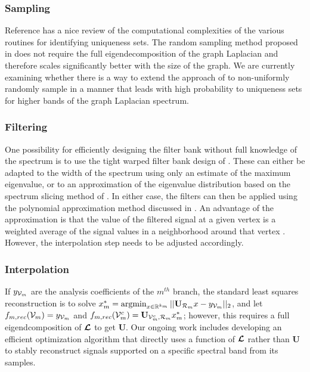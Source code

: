 \documentclass[journal, 10pt]{IEEEtran}
\begin{document}
\subsubsection{Sampling}

Reference \cite{anis2016efficient} has a nice review of the computational complexities of the various routines for identifying uniqueness sets.  The random sampling method proposed in \cite{PuyTGV15} does not require the full eigendecomposition of the graph Laplacian and therefore scales significantly better with the size of the graph.
We are currently examining whether there is a way to extend the approach of \cite{PuyTGV15} to non-uniformly randomly sample in a manner that leads with high probability to uniqueness sets for higher bands of the graph Laplacian spectrum.
 
\subsubsection{Filtering}\label{Se:filtering}
One possibility for efficiently designing the filter bank without full knowledge of the spectrum is to use the tight warped filter bank design of \cite{shuman2013spectrum}. These can either be adapted to the width of the spectrum using only an estimate of the maximum eigenvalue, or to an approximation of the eigenvalue distribution based on the spectrum slicing method of \cite[Section 3.3]{parlett}. In either case, the filters can then be applied using the polynomial approximation method discussed in \cite{hammond2011wavelets,shuman_DCOSS_2011}. An advantage of the approximation is that the value of the filtered signal at a given vertex is a weighted average of the signal values in a neighborhood around that vertex \cite{shuman2013emerging}. However, the interpolation step needs to be adjusted accordingly. 

\subsubsection{Interpolation}
If $y_{{\mathcal{V}}_m}$ are the analysis coefficients of the $m^{th}$ branch, the standard least squares reconstruction is to solve $x_m^*=\argmin_{x \in \R^{k_m}} ||\mathbf{U}_{{\cal R}_m}x - y_{\V_m} ||_2$, and let $f_{m,{rec}}({\mathcal{V}}_m)=y_{{\mathcal{V}}_m}$ and $f_{m,{rec}}(\V_m^c)=\mathbf{U}_{\V_m^c,{\cal R}_m}x_m^*$; however, this requires a full eigendcomposition of $\boldsymbol{\mathcal{L}}$ to get $\mathbf{U}$. Our ongoing work includes developing an efficient optimization algorithm that directly uses a function of $\boldsymbol{\mathcal{L}}$ rather than $\mathbf{U}$ to stably reconstruct signals supported on a specific spectral band from its samples. 
\end{document}
